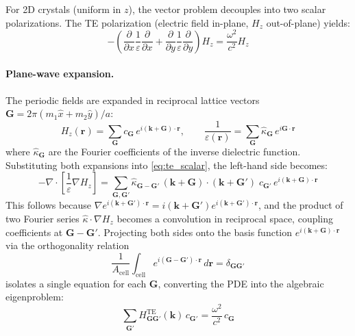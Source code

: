 \documentclass[11pt]{article}
\begin{document}
For 2D crystals (uniform in $z$), the vector problem decouples into two scalar polarizations. The TE polarization (electric field in-plane, $H_z$ out-of-plane) yields:
\begin{equation}
    -\left(\frac{\partial}{\partial x}\frac{1}{\varepsilon}\frac{\partial}{\partial x} + \frac{\partial}{\partial y}\frac{1}{\varepsilon}\frac{\partial}{\partial y}\right) H_z = \frac{\omega^2}{c^2} H_z
    \label{eq:te_scalar}
\end{equation}

\paragraph{Plane-wave expansion.} The periodic fields are expanded in reciprocal lattice vectors $\mathbf{G} = 2\pi(m_1 \hat{x} + m_2 \hat{y})/a$:
\begin{equation}
    H_z(\mathbf{r}) = \sum_{\mathbf{G}} c_{\mathbf{G}} \, e^{i(\mathbf{k}+\mathbf{G})\cdot\mathbf{r}}, \qquad
    \frac{1}{\varepsilon(\mathbf{r})} = \sum_{\mathbf{G}} \hat{\kappa}_{\mathbf{G}} \, e^{i\mathbf{G}\cdot\mathbf{r}}
\end{equation}
where $\hat{\kappa}_{\mathbf{G}}$ are the Fourier coefficients of the inverse dielectric function. Substituting both expansions into \cref{eq:te_scalar}, the left-hand side becomes:
\begin{equation}
    -\nabla \cdot \!\left[\frac{1}{\varepsilon}\nabla H_z\right]
    = \sum_{\mathbf{G},\mathbf{G}'} \hat{\kappa}_{\mathbf{G}-\mathbf{G}'}\,
      (\mathbf{k}{+}\mathbf{G}) \cdot (\mathbf{k}{+}\mathbf{G}')\;
      c_{\mathbf{G}'}\, e^{i(\mathbf{k}+\mathbf{G})\cdot\mathbf{r}}
\end{equation}
This follows because $\nabla e^{i(\mathbf{k}+\mathbf{G}')\cdot\mathbf{r}} = i(\mathbf{k}+\mathbf{G}')e^{i(\mathbf{k}+\mathbf{G}')\cdot\mathbf{r}}$, and the product of two Fourier series $\hat{\kappa} \cdot \nabla H_z$ becomes a convolution in reciprocal space, coupling coefficients at $\mathbf{G}-\mathbf{G}'$. Projecting both sides onto the basis function $e^{i(\mathbf{k}+\mathbf{G})\cdot\mathbf{r}}$ via the orthogonality relation
\begin{equation}
    \frac{1}{A_\text{cell}}\int_\text{cell} e^{i(\mathbf{G}-\mathbf{G}')\cdot\mathbf{r}}\,d\mathbf{r} = \delta_{\mathbf{G}\mathbf{G}'}
\end{equation}
isolates a single equation for each $\mathbf{G}$, converting the PDE into the algebraic eigenproblem:
\begin{equation}
    \sum_{\mathbf{G}'} H^{\text{TE}}_{\mathbf{G}\mathbf{G}'}(\mathbf{k})\, c_{\mathbf{G}'} = \frac{\omega^2}{c^2}\, c_{\mathbf{G}}
    \label{eq:pwe_te}
\end{equation}
\end{document}
